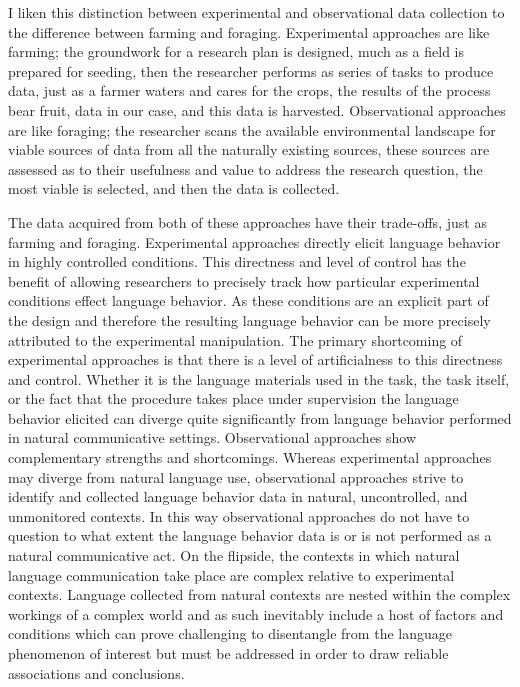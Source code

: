 \documentclass[
]{article}
\begin{document}
I liken this distinction between experimental and observational data collection to the difference between farming and foraging. Experimental approaches are like farming; the groundwork for a research plan is designed, much as a field is prepared for seeding, then the researcher performs as series of tasks to produce data, just as a farmer waters and cares for the crops, the results of the process bear fruit, data in our case, and this data is harvested. Observational approaches are like foraging; the researcher scans the available environmental landscape for viable sources of data from all the naturally existing sources, these sources are assessed as to their usefulness and value to address the research question, the most viable is selected, and then the data is collected.

The data acquired from both of these approaches have their trade-offs, just as farming and foraging. Experimental approaches directly elicit language behavior in highly controlled conditions. This directness and level of control has the benefit of allowing researchers to precisely track how particular experimental conditions effect language behavior. As these conditions are an explicit part of the design and therefore the resulting language behavior can be more precisely attributed to the experimental manipulation. The primary shortcoming of experimental approaches is that there is a level of artificialness to this directness and control. Whether it is the language materials used in the task, the task itself, or the fact that the procedure takes place under supervision the language behavior elicited can diverge quite significantly from language behavior performed in natural communicative settings. Observational approaches show complementary strengths and shortcomings. Whereas experimental approaches may diverge from natural language use, observational approaches strive to identify and collected language behavior data in natural, uncontrolled, and unmonitored contexts. In this way observational approaches do not have to question to what extent the language behavior data is or is not performed as a natural communicative act. On the flipside, the contexts in which natural language communication take place are complex relative to experimental contexts. Language collected from natural contexts are nested within the complex workings of a complex world and as such inevitably include a host of factors and conditions which can prove challenging to disentangle from the language phenomenon of interest but must be addressed in order to draw reliable associations and conclusions.
\end{document}
